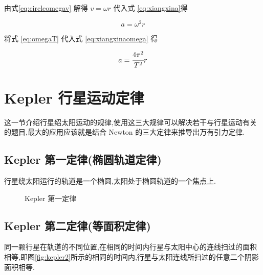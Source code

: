 由式\eqref{eq:circleomegav} 解得 $v=\omega r$ 代入式 \eqref{eq:xiangxina}得

\begin{equation}
  a=\omega^2r
  \label{eq:xiangxinaomega}
\end{equation}

将式 \eqref{eq:omegaT} 代入式 \eqref{eq:xiangxinaomega} 得

\begin{equation}
  a=\cfrac{4\pi^2}{T^2}r
  \label{eq:xiangxinaT}
\end{equation}

\section{Kepler 行星运动定律}

这一节介绍行星绍太阳运动的规律,使用这三大规律可以解决若干与行星运动有关的题目,最大的应用应该就是结合 Newton 的三大定律来推导出万有引力定律.

\subsection{Kepler 第一定律(椭圆轨道定律)}

行星绕太阳运行的轨道是一个椭圆,太阳处于椭圆轨道的一个焦点上.

\begin{figure}[H]
  \centering
  \caption{Kepler 第一定律}
  \label{fig:kepler1}
\end{figure}

\subsection{Kepler 第二定律(等面积定律)}

同一颗行星在轨道的不同位置,在相同的时间内行星与太阳中心的连线扫过的面积相等,即图\ref{fig:kepler2}所示的相同的时间内,行星与太阳连线所扫过的任意二个阴影面积相等.

